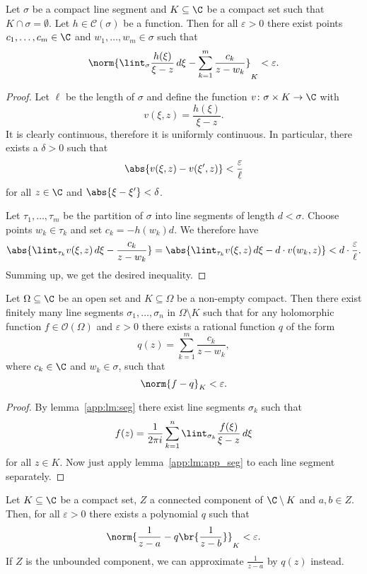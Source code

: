 \begin{lema}\label{app:lm:app_seg}
Let $\sigma$ be a compact line segment and $K \subseteq \C$ be a
compact set such that $K \cap \sigma = \emptyset$. Let
$h \in \mathcal{C}(\sigma)$ be a function. Then for all
$\varepsilon > 0$ there exist points $c_1, \dots, c_m \in \C$ and
$w_1, \dots, w_m \in \sigma$ such that
\[
\norm{\lint_\sigma \frac{h(\xi)}{\xi - z}\,d\xi -
\sum_{k=1}^m \frac{c_k}{z - w_k}}_K <
\varepsilon.
\]
\end{lema}

\begin{proof}
Let $\ell$ be the length of $\sigma$ and define the function
$v \colon \sigma \times K \to \C$ with
\[
v(\xi, z) = \frac{h(\xi)}{\xi - z}.
\]
It is clearly continuous, therefore it is uniformly continuous. In
particular, there exists a $\delta > 0$ such that
\[
\abs{v(\xi, z) - v(\xi', z)} < \frac{\varepsilon}{\ell}
\]
for all $z \in \C$ and $\abs{\xi - \xi'} < \delta$.

Let $\tau_1, \dots, \tau_m$ be the partition of $\sigma$ into line
segments of length $d < \sigma$. Choose points $w_k \in \tau_k$ and
set $c_k = - h(w_k) d$. We therefore have
\[
\abs{\lint_{\tau_k} v(\xi, z)\,d\xi - \frac{c_k}{z - w_k}} =
\abs{\lint_{\tau_k} v(\xi, z)\,d\xi - d \cdot v(w_k, z)} <
d \cdot \frac{\varepsilon}{\ell}.
\]
Summing up, we get the desired inequality.
\end{proof}

\begin{lema}\label{app:lm:app_by_rat}
Let $\Omega \subseteq \C$ be an open set and $K \subseteq \Omega$
be a non-empty compact. Then there exist finitely many line
segments $\sigma_1, \dots, \sigma_n$ in $\Omega \setminus K$ such
that for any holomorphic function $f \in \mathcal{O}(\Omega)$ and
$\varepsilon > 0$ there exists a rational function $q$ of the form
\[
q(z) = \sum_{k=1}^m \frac{c_k}{z - w_k},
\]
where $c_k \in \C$ and $w_k \in \sigma$, such that
\[
\norm{f - q}_K < \varepsilon.
\]
\end{lema}

\begin{proof}
By lemma~\ref{app:lm:seg} there exist line segments $\sigma_k$ such
that
\[
f(z) = \frac{1}{2 \pi i} \sum_{k=1}^n
\lint_{\sigma_k} \frac{f(\xi)}{\xi - z}\,d\xi
\]
for all $z \in K$. Now just apply lemma~\ref{app:lm:app_seg} to
each line segment separately.
\end{proof}


\begin{lema}
Let $K \subseteq \C$ be a compact set, $Z$ a connected component of
$\C \setminus K$ and $a, b \in Z$. Then, for all $\varepsilon > 0$
there exists a polynomial $q$ such that
\[
\norm{\frac{1}{z-a} - q \br{\frac{1}{z-b}}}_K < \varepsilon.
\]
If $Z$ is the unbounded component, we can approximate
$\frac{1}{z-a}$ by $q(z)$ instead.
\end{lema}

